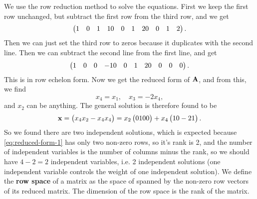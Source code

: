 \documentclass[hyperref, a4paper]{article}
\newcommand*{\concept}[1]{{\textbf{#1}}}
\def\\{}%
\newcommand*{\mat}[1]{\vb{#1}}
\begin{document}
We use the row reduction method to solve the equations.
First we keep the first row unchanged,
but subtract the first row from the third row, and we get 
\[
    \pmqty{
        1 & 0 & 1 & 1 \\
        0 & 0 & 1 & 2 \\
        0 & 0 & 1 & 2
    }.
\]
Then we can just set the third row to zeros 
because it duplicates with the second line.
Then we can subtract the second line from the first line, and get 
\begin{equation}
    \pmqty{
        1 & 0 & 0 & -1 \\
        0 & 0 & 1 & 2 \\
        0 & 0 & 0 & 0
    }.
    \label{eq:reduced-form-1}
\end{equation}
This is in row echelon form.
Now we get the reduced form of $\mat{A}$,
and from this, we find 
\begin{equation}
    x_4 = x_1, \quad x_3 = - 2 x_4,
\end{equation}
and $x_2$ can be anything.
The general solution is therefore found to be 
\begin{equation}
    \vb{x} = \pmqty{
        x_4 \\ x_2 \\ - x_4 \\ x_4
    } = x_2 \pmqty{0 \\ 1 \\ 0 \\ 0}
    + x_4 \pmqty{1 \\ 0 \\ -2 \\ 1}.
    \label{eq:general-solution-1}
\end{equation}
So we found there are two independent solutions, 
which is expected because \eqref{eq:reduced-form-1} has only two non-zero rows,
so it's rank is 2, 
and the number of independent variables is the number of columns minus the rank,
so we should have $4 - 2 = 2$ independent variables, 
i.e. 2 independent solutions 
(one independent variable controls the weight of one independent solution).
We define the \concept{row space} of a matrix 
as the space of spanned by the non-zero row vectors 
of its reduced matrix.
The dimension of the row space is the rank of the matrix.
\end{document}
